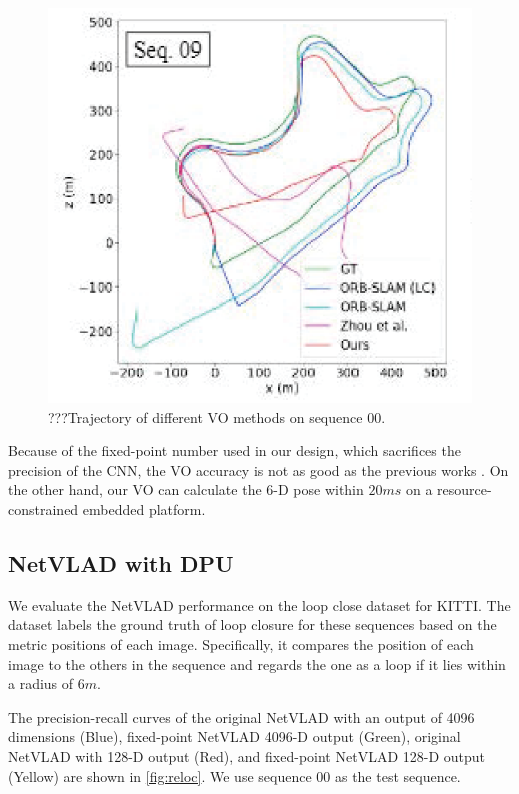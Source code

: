 \begin{figure}[t]
    \centering  
    \includegraphics[width=0.75\linewidth]{fig/VO.eps}
    \caption{???Trajectory of different VO methods on sequence 00.}
    \label{fig:VO}
\end{figure}


Because of the fixed-point number used in our design, which sacrifices the precision of the CNN, the VO accuracy is not as good as the previous works \cite{Mur-Artal:2017281, Zhan:2018e92}. On the other hand, our VO can calculate the 6-D pose within $20ms$ on a resource-constrained embedded platform.

\subsection{NetVLAD with DPU}

We evaluate the NetVLAD performance on the loop close dataset for KITTI\cite{KITTIGroundTruth}.
The dataset labels the ground truth of loop closure for these sequences based on the metric positions of each image. Specifically, it compares the position of each image to the others in the sequence and regards the one as a loop if it lies within a radius of $6m$.

The precision-recall curves of the original NetVLAD with an output of 4096 dimensions (Blue), fixed-point NetVLAD 4096-D output (Green), original NetVLAD with 128-D output (Red), and fixed-point NetVLAD 128-D output (Yellow) are shown in \cref{fig:reloc}. We use sequence 00 as the test sequence.


